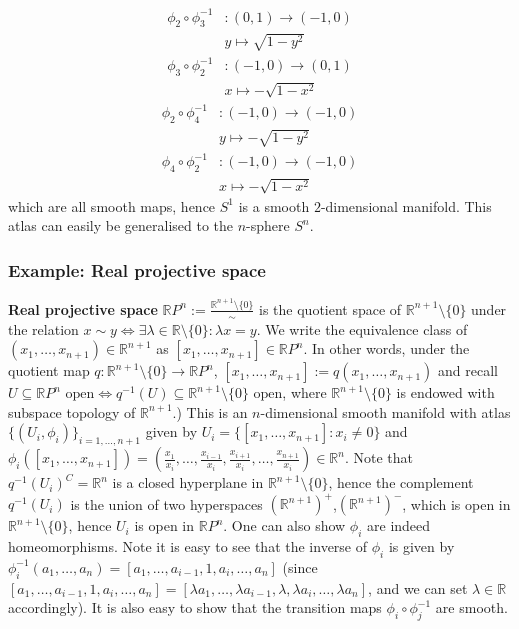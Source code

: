 \documentclass[a4paper]{article}
\theoremstyle{definition} \newtheorem*{definition}{Definition}
\theoremstyle{definition} \newtheorem*{definitions}{Definitions}
\theoremstyle{plain} \newtheorem{theorem}{Theorem}[section]
\theoremstyle{plain} \newtheorem{proposition}[theorem]{Proposition}
\theoremstyle{plain} \newtheorem{corollary}[theorem]{Corollary}
\theoremstyle{plain} \newtheorem{lemma}[theorem]{Lemma}
\theoremstyle{plain} \newtheorem{example}[theorem]{Example}
\newcommand{\defn}[1]{\textbf{#1}}
\newcommand{\realnos}{\mathbb{R}}
\begin{document}
\begin{align*}
\phi_2 \circ \phi_3^{-1} & : (0,1) \to (-1, 0) \\
& y \mapsto \sqrt{1-y^2}
\end{align*}
\begin{align*}
\phi_3 \circ \phi_2^{-1} & : (-1,0) \to (0,1)\\
& x \mapsto -\sqrt{1-x^2}
\end{align*}
\begin{align*}
\phi_2 \circ \phi_4^{-1} & : (-1,0) \to (-1,0)\\
& y \mapsto -\sqrt{1-y^2}
\end{align*}
\begin{align*}
\phi_4 \circ \phi_2^{-1} & : (-1,0) \to (-1,0)\\
& x \mapsto -\sqrt{1-x^2}
\end{align*}
which are all smooth maps, hence $S^1$ is a smooth $2$-dimensional manifold. This atlas can easily be generalised to the $n$-sphere $S^n$.

\subsubsection{Example: Real projective space}

\defn{Real projective space} $\realnos P^n := \frac{\realnos^{n+1}\setminus \{0\}}{\sim}$ is the quotient space of $\realnos^{n+1}\setminus \{0\}$ under the relation $x\sim y \iff \exists \lambda \in \realnos \setminus \{0\} : \lambda x=y$. We write the equivalence class of $(x_1, \ldots, x_{n+1})\in \realnos^{n+1}$ as $[x_1, \ldots, x_{n+1}]\in \realnos P^n$. 
In other words, under the quotient map $q:\realnos^{n+1}\setminus \{0\}\to \realnos P^n$, $[x_1, \ldots, x_{n+1}]:=q(x_1, \ldots, x_{n+1})$ and recall $U \subseteq \realnos P^n \textrm{ open} \iff q^{-1}(U) \subseteq \realnos^{n+1}\setminus \{0\} \textrm{ open}$, where $\realnos^{n+1}\setminus \{0\}$ is endowed with subspace topology of $\realnos^{n+1}$.) 
This is an $n$-dimensional smooth manifold with atlas $\{(U_i, \phi_i)\}_{i=1, \ldots, n+1}$ given by $U_i=\{[x_1, \ldots, x_{n+1}]: x_i\neq 0\}$ and $\phi_i([x_1, \ldots, x_{n+1}])=(\frac{x_1}{x_i}, \ldots , \frac{x_{i-1}}{x_i}, \frac{x_{i+1}}{x_i}, \ldots, \frac{x_{n+1}}{x_i})\in \realnos^n$. Note that $q^{-1}(U_i)^C=\realnos^n$ is a closed hyperplane in $\realnos^{n+1}\setminus \{0\}$, hence the complement $q^{-1}(U_i)$ is the union of two hyperspaces $(\realnos^{n+1})^+$,$(\realnos^{n+1})^-$, which is open in $\realnos^{n+1}\setminus \{0\}$, hence $U_i$ is open in $\realnos P^n$. One can also show $\phi_i$ are indeed homeomorphisms.  Note it is easy to see that the inverse of $\phi_i$ is given by $\phi_i^{-1}(a_1, \ldots, a_n)=[a_1, \ldots, a_{i-1}, 1, a_{i}, \ldots, a_n]$ (since $[a_1, \ldots, a_{i-1}, 1, a_{i}, \ldots, a_n]=[\lambda a_1, \ldots, \lambda a_{i-1}, \lambda, \lambda a_{i}, \ldots, \lambda a_n]$, and we can set $\lambda\in \realnos$ accordingly). It is also easy to show that the transition maps $\phi_i\circ \phi_j^{-1}$ are smooth. 
\end{document}
